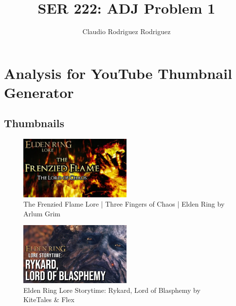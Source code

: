 \documentclass{article}
\begin{document}
\title{SER 222: ADJ Problem 1}
\author{Claudio Rodriguez Rodriguez}
\maketitle







\section{Analysis for YouTube Thumbnail Generator}

\subsection{Thumbnails}


\begin{figure}[h!]
\centering
\includegraphics[width=0.5\textwidth]{Arlum Grim.png}
\caption{The Frenzied Flame Lore | Three Fingers of Chaos | Elden Ring by Arlum Grim}
\label{fig:thumbnail1}
\end{figure}

\begin{figure}[h!]
  \centering
  \includegraphics[width=0.5\textwidth]{KiteTales and Flex.png}
  \caption{Elden Ring Lore Storytime: Rykard, Lord of Blasphemy by KiteTales \& Flex}
  \label{fig:thumbnail2}
  \end{figure}
\end{document}

